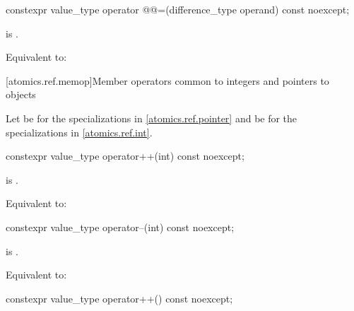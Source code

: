 %
%
\begin{itemdecl}
constexpr value_type operator @@=(difference_type operand) const noexcept;
\end{itemdecl}

\begin{itemdescr}
\pnum
\constraints
{} is .

\pnum
\effects
Equivalent to:
\end{itemdescr}

[atomics.ref.memop]{Member operators
                          common to integers and pointers to objects}

\pnum
Let 
be 
for the specializations in \ref{atomics.ref.pointer} and
be 
for the specializations in \ref{atomics.ref.int}.


%
%
\begin{itemdecl}
constexpr value_type operator++(int) const noexcept;
\end{itemdecl}

\begin{itemdescr}
\pnum
\constraints
{} is .

\pnum
\effects
Equivalent to: 
\end{itemdescr}

%
%
\begin{itemdecl}
constexpr value_type operator--(int) const noexcept;
\end{itemdecl}

\begin{itemdescr}
\pnum
\constraints
{} is .

\pnum
\effects
Equivalent to: 
\end{itemdescr}

%
%
\begin{itemdecl}
constexpr value_type operator++() const noexcept;
\end{itemdecl}

